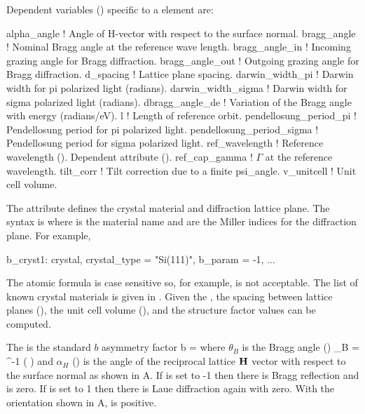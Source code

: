 Dependent variables () specific to a  element are:
\begin{example}
  alpha_angle                ! Angle of H-vector with respect to the surface normal.
  bragg_angle                ! Nominal Bragg angle at the reference wave length. 
  bragg_angle_in             ! Incoming grazing angle for Bragg diffraction.
  bragg_angle_out            ! Outgoing grazing angle for Bragg diffraction.
  d_spacing                  ! Lattice plane spacing. 
  darwin_width_pi            ! Darwin width for pi polarized light (radians).
  darwin_width_sigma         ! Darwin width for sigma polarized light (radians).
  dbragg_angle_de            ! Variation of the Bragg angle with energy (radians/eV).
  l                          ! Length of reference orbit.
  pendellosung_period_pi     ! Pendellosung period for pi polarized light.
  pendellosung_period_sigma  ! Pendellosung period for sigma polarized light.
  ref_wavelength             ! Reference wavelength (). Dependent attribute ().
  ref_cap_gamma              ! \(\Gamma\) at the reference wavelength.
  tilt_corr                  ! Tilt correction due to a finite psi_angle.
  v_unitcell                 ! Unit cell volume. 
\end{example}

The  attribute defines the crystal material and
diffraction lattice plane. The syntax is  where 
is the material name and  are the Miller
indices for the diffraction plane. For example,
\begin{example}
  b_cryst1: crystal, crystal_type = "Si(111)", b_param = -1, ...
\end{example}
The atomic formula is case sensitive so, for example, 
is not acceptable. The list of known crystal materials is given in
. Given the , the spacing between
lattice planes (), the unit cell volume
(), and the structure factor\cite{b:batterman} values
can be computed.

The  is the standard $b$ asymmetry factor
\Begineq
  b =  
  \label{batat}
\Endeq
where $\theta_B$ is the Bragg angle () 
\Begineq
  \theta_B = \sin^{-1} \left(  \right)
  \label{tsl2d}
\Endeq
and $\alpha_H$ () is the angle of the reciprocal
lattice ${\bf H}$ vector with respect to the surface normal as shown in
A.  If  is set to -1 then there is
Bragg reflection and  is zero. If  is set to 1
then there is Laue diffraction again with  zero. With the
orientation shown in A,  is positive.

